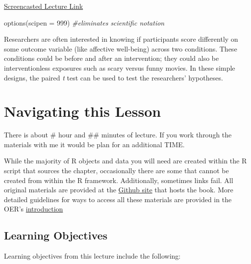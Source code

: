 \documentclass[
  11pt,
]{book}
\newenvironment{Shaded}{\begin{snugshade}}{\end{snugshade}}
\newcommand{\AttributeTok}[1]{\textcolor[rgb]{0.77,0.63,0.00}{#1}}
\newcommand{\CommentTok}[1]{\textcolor[rgb]{0.56,0.35,0.01}{\textit{#1}}}
\newcommand{\DecValTok}[1]{\textcolor[rgb]{0.00,0.00,0.81}{#1}}
\newcommand{\FunctionTok}[1]{\textcolor[rgb]{0.00,0.00,0.00}{#1}}
\newcommand{\NormalTok}[1]{#1}
\begin{document}
\href{link\%20here}{Screencasted Lecture Link}

\begin{Shaded}
\begin{Highlighting}[]
\FunctionTok{options}\NormalTok{(}\AttributeTok{scipen =} \DecValTok{999}\NormalTok{)  }\CommentTok{\#eliminates scientific notation}
\end{Highlighting}
\end{Shaded}

Researchers are often interested in knowing if participants score differently on some outcome variable (like affective well-being) across two conditions. These conditions could be before and after an intervention; they could also be interventionless exposures such as scary versus funny movies. In these simple designs, the paired \emph{t} test can be used to test the researchers' hypotheses.

\hypertarget{navigating-this-lesson-4}{%
\section{Navigating this Lesson}\label{navigating-this-lesson-4}}

There is about \# hour and \#\# minutes of lecture. If you work through the materials with me it would be plan for an additional TIME.

While the majority of R objects and data you will need are created within the R script that sources the chapter, occasionally there are some that cannot be created from within the R framework. Additionally, sometimes links fail. All original materials are provided at the \href{https://github.com/lhbikos/ReCenterPsychStats}{Github site} that hosts the book. More detailed guidelines for ways to access all these materials are provided in the OER's \protect\hyperlink{ReCintro}{introduction}

\hypertarget{learning-objectives-4}{%
\subsection{Learning Objectives}\label{learning-objectives-4}}

Learning objectives from this lecture include the following:
\end{document}
